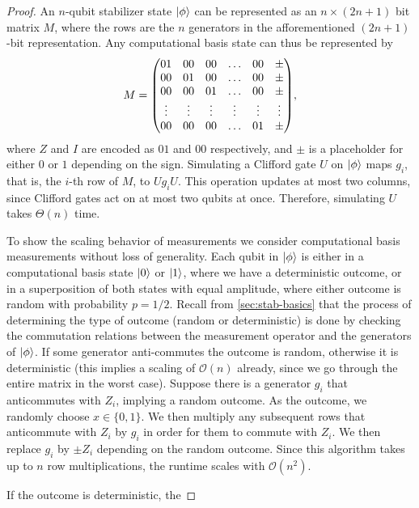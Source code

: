 \begin{proof}
  An $n$-qubit stabilizer state $\ket{\phi}$ can be represented as an
  $n\times(2n+1)$ bit matrix $M$, where the rows are the $n$ generators in the
  afforementioned $(2n+1)$-bit representation. Any computational basis state can
  thus be represented by
  \[
    M = \mqty( 
    01 & 00 & 00 & \ldots & 00 & \pm \\
    00 & 01 & 00 & \ldots & 00 & \pm \\
    00 & 00 & 01 & \ldots & 00 & \pm \\
    \vdots & \vdots & \vdots & \vdots & \vdots & \vdots \\
    00 & 00 & 00 & \ldots & 01 & \pm \\
    ),
  \]
  where $Z$ and $I$ are encoded as $01$ and $00$ respectively, and $\pm$ is a
  placeholder for either $0$ or $1$ depending on the sign. Simulating a
  Clifford gate $U$ on $\ket{\phi}$ maps $g_i$, that is, the $i$-th row of $M$,
  to $U g_i U$. This operation updates at most two columns, since Clifford
  gates act on at most two qubits at once. Therefore, simulating $U$ takes $\Theta(n)$
  time.

  To show the scaling behavior of measurements we consider computational basis
  measurements without loss of generality. Each qubit in $\ket{\phi}$ is either
  in a computational basis state $\ket{0}$ or $\ket{1}$, where we have a
  deterministic outcome, or in a superposition
  of both states with equal amplitude, where either outcome is random with
  probability $p=1 / 2$. Recall from \cref{sec:stab-basics} that the process of
  determining the type of outcome (random or deterministic) is done by checking
  the commutation relations between the measurement operator and the generators
  of $\ket{\phi}$. If some generator anti-commutes the outcome is random,
  otherwise it is deterministic (this implies a scaling of $\mathcal{O}(n)$
  already, since we go through the entire matrix in the worst case). Suppose
  there is a generator $g_i$ that anticommutes with $Z_i$, implying a random outcome. As the
  outcome, we randomly choose $x\in\{0,1\}$. We then multiply any subsequent
  rows that anticommute with $Z_i$ by $g_i$ in order for them to commute with
  $Z_i$. We then replace $g_i$ by $\pm Z_i$ depending on the random outcome.
  Since this algorithm takes up to $n$ row multiplications, the runtime scales
  with $\mathcal{O}(n^2)$.

  If the outcome is deterministic, the 
\end{proof}
%
%

